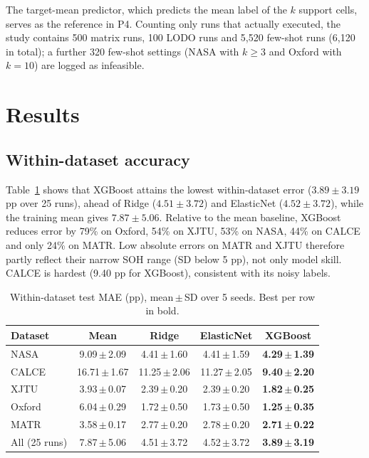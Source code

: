 \documentclass[journal]{IEEEtran}
\begin{document}
The target-mean predictor, which predicts the mean label of the $k$ support cells, serves as the reference in P4. Counting only runs that actually executed, the study contains 500 matrix runs, 100 LODO runs and 5,520 few-shot runs (6,120 in total); a further 320 few-shot settings (NASA with $k\ge3$ and Oxford with $k=10$) are logged as infeasible.

\section{Results}
\subsection{Within-dataset accuracy}
Table~\ref{tab:within} shows that XGBoost attains the lowest within-dataset error ($3.89\pm3.19$ pp over 25 runs), ahead of Ridge ($4.51\pm3.72$) and ElasticNet ($4.52\pm3.72$), while the training mean gives $7.87\pm5.06$. Relative to the mean baseline, XGBoost reduces error by 79\% on Oxford, 54\% on XJTU, 53\% on NASA, 44\% on CALCE and only 24\% on MATR. Low absolute errors on MATR and XJTU therefore partly reflect their narrow SOH range (SD below 5 pp), not only model skill. CALCE is hardest (9.40 pp for XGBoost), consistent with its noisy labels.

\begin{table}[!t]
\caption{Within-dataset test MAE (pp), mean\,$\pm$\,SD over 5 seeds. Best per row in bold.}
\label{tab:within}
\centering
\scriptsize
\setlength{\tabcolsep}{3pt}
\begin{tabular}{lcccc}
\toprule
Dataset & Mean & Ridge & ElasticNet & XGBoost \\
\midrule
NASA & 9.09\,$\pm$\,2.09 & 4.41\,$\pm$\,1.60 & 4.41\,$\pm$\,1.59 & \textbf{4.29\,$\pm$\,1.39} \\
CALCE & 16.71\,$\pm$\,1.67 & 11.25\,$\pm$\,2.06 & 11.27\,$\pm$\,2.05 & \textbf{9.40\,$\pm$\,2.20} \\
XJTU & 3.93\,$\pm$\,0.07 & 2.39\,$\pm$\,0.20 & 2.39\,$\pm$\,0.20 & \textbf{1.82\,$\pm$\,0.25} \\
Oxford & 6.04\,$\pm$\,0.29 & 1.72\,$\pm$\,0.50 & 1.73\,$\pm$\,0.50 & \textbf{1.25\,$\pm$\,0.35} \\
MATR & 3.58\,$\pm$\,0.17 & 2.77\,$\pm$\,0.20 & 2.78\,$\pm$\,0.20 & \textbf{2.71\,$\pm$\,0.22} \\
\midrule
All (25 runs) & 7.87\,$\pm$\,5.06 & 4.51\,$\pm$\,3.72 & 4.52\,$\pm$\,3.72 & \textbf{3.89\,$\pm$\,3.19} \\
\bottomrule
\end{tabular}
\end{table}
\end{document}
